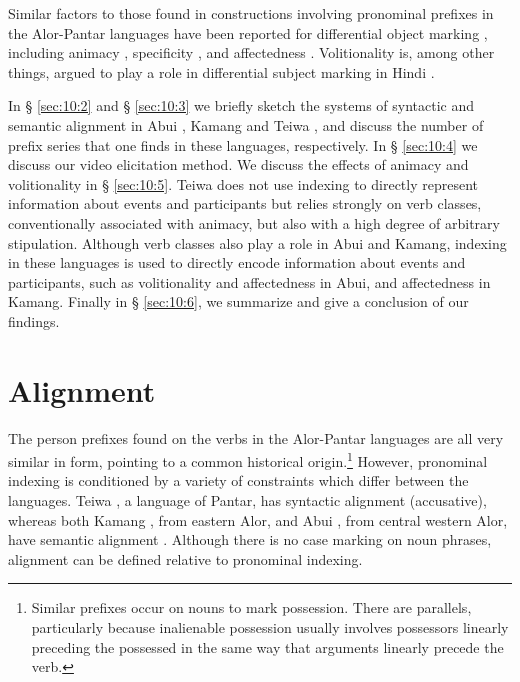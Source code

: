 Similar factors to those found in constructions involving pronominal prefixes  in the Alor-Pantar languages have been reported for differential object marking , including animacy  \citep{Bossong1991,Croft1988,Aissen2003}, specificity  \citep{VonHeusingerEtAl2005}, and affectedness  \citep{HopperEtAl1980,Tsunoda1981,Tsunoda1985,VonHeusingerEtAl2011}. Volitionality  is, among other things, argued to play a role in differential subject marking  in Hindi  \citep{Mohanan1990}.

In {\S} \ref{sec:10:2} and {\S} \ref{sec:10:3} we briefly sketch the systems of syntactic and semantic alignment in Abui , Kamang  and Teiwa , and discuss the number of prefix series that one finds in these languages, respectively. In {\S} \ref{sec:10:4} we discuss our video elicitation method. We discuss the effects of animacy and volitionality in {\S} \ref{sec:10:5}. Teiwa does not use indexing to directly represent information about events and participants but relies strongly on verb classes, conventionally associated with animacy, but also with a high degree of arbitrary stipulation. Although verb classes also play a role in Abui and Kamang, indexing in these languages is used to directly encode information about events and participants, such as volitionality and affectedness in Abui, and affectedness in Kamang. Finally in {\S} \ref{sec:10:6}, we summarize and give a conclusion of our findings.

\section{Alignment} 
\label{sec:10:2}
The person prefixes found on the verbs in the Alor-Pantar languages are all very similar in form, pointing to a common historical origin.\footnote{Similar prefixes occur on nouns to mark possession. There are parallels, particularly because inalienable possession usually involves possessors linearly preceding the possessed in the same way that arguments linearly precede the verb.} However, pronominal indexing  is conditioned by a variety of constraints which differ between the languages. Teiwa , a language of Pantar, has syntactic alignment  (accusative), whereas both Kamang , from eastern Alor, and Abui , from central western Alor, have semantic alignment . Although there is no case marking on noun phrases, alignment can be defined relative to pronominal indexing. 

